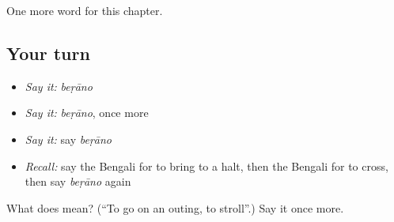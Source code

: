 \begin{grammarlens}[title={What you've built}]
One more word for this chapter.
\end{grammarlens}

\subsection*{Your turn}
\begin{itemize}
\raggedright
  \item \emph{Say it:} \emph{beṛāno}
  \item \emph{Say it:} \emph{beṛāno}, once more
  \item \emph{Say it:} say \emph{beṛāno}
  \item \emph{Recall:} say the Bengali for to bring to a halt, then the Bengali for to cross, then say \emph{beṛāno} again
\end{itemize}

\begin{tcolorbox}[breakable,colback=teal!4,colframe=teal!35!black,title={Before you move on}]
What does  mean? (\textquotedblleft{}To go on an outing, to stroll\textquotedblright{}.) Say it once more.
\end{tcolorbox}
